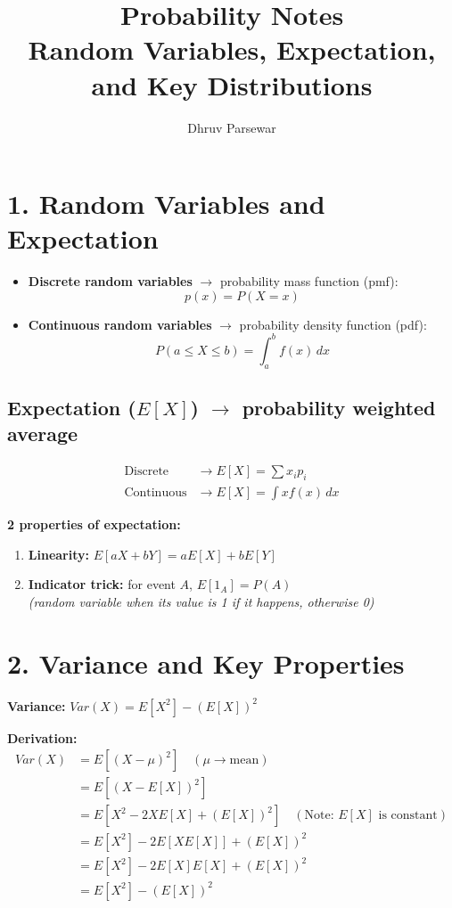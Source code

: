 \documentclass[11pt,a4paper]{article}
\title{\vspace{-2cm}\textbf{\textcolor{primary}{Probability Notes}}\\\Large{Random Variables, Expectation, and Key Distributions}}
\author{Dhruv Parsewar}
\date{}
\begin{document}
\maketitle

\section*{\textcolor{secondary}{1. Random Variables and Expectation}}

\begin{itemize}
    \item \textbf{Discrete random variables} $\rightarrow$ probability mass function (pmf): 
    \[ p(x) = P(X=x) \]
    \item \textbf{Continuous random variables} $\rightarrow$ probability density function (pdf): 
    \[ P(a \leq X \leq b) = \int_a^b f(x) \, dx \]
\end{itemize}

\subsection*{Expectation ($E[X]$) $\rightarrow$ probability weighted average}
\begin{align*}
    \text{Discrete} &\rightarrow E[X] = \sum x_i p_i \\
    \text{Continuous} &\rightarrow E[X] = \int x f(x) \, dx
\end{align*}

\textbf{2 properties of expectation:}
\begin{enumerate}
    \item \textbf{Linearity:} $E[aX + bY] = aE[X] + bE[Y]$
    \item \textbf{Indicator trick:} for event $A$, $E[1_A] = P(A)$ 
    \\ \textit{(random variable when its value is 1 if it happens, otherwise 0)}
\end{enumerate}

\section*{\textcolor{secondary}{2. Variance and Key Properties}}

\textbf{Variance:} $Var(X) = E[X^2] - (E[X])^2$

\textbf{Derivation:}
\begin{align*}
    Var(X) &= E[(X-\mu)^2] \quad (\mu \rightarrow \text{mean}) \\
    &= E[(X - E[X])^2] \\
    &= E[X^2 - 2X E[X] + (E[X])^2] \quad (\text{Note: } E[X] \text{ is constant})\\
    &= E[X^2] - 2E[X E[X]] + (E[X])^2 \\
    &= E[X^2] - 2E[X]E[X] + (E[X])^2 \\
    &= E[X^2] - (E[X])^2
\end{align*}
\end{document}
